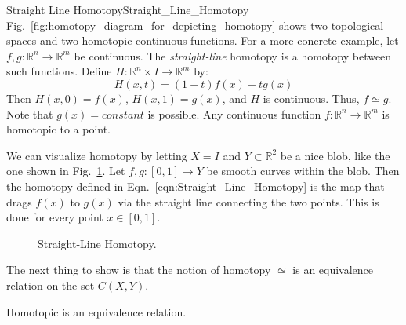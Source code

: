             \begin{lexample}{Straight Line Homotopy}{Straight_Line_Homotopy}
                Fig.~\ref{fig:homotopy_diagram_for_depicting_homotopy} shows
                two topological spaces and two homotopic continuous functions.
                For a more concrete example, let
                $f,g:\mathbb{R}^{n}\rightarrow\mathbb{R}^{m}$ be continuous.
                The \textit{straight-line} homotopy is a homotopy between such
                functions. Define
                $H:\mathbb{R}^{n}\times{I}\rightarrow\mathbb{R}^{m}$ by:
                \begin{equation}
                    \label{eqn:Straight_Line_Homotopy}
                    H(x,t)=(1-t)f(x)+tg(x)
                \end{equation}
                Then $H(x,0)=f(x)$, $H(x,1)=g(x)$, and $H$ is continuous. Thus,
                ${f}\simeq{g}$. Note that $g(x)=constant$ is possible. Any
                continuous function $f:\mathbb{R}^{n}\rightarrow\mathbb{R}^{m}$
                is homotopic to a point.
            \end{lexample}
            We can visualize homotopy by letting $X=I$ and
            $Y\subset\mathbb{R}^{2}$ be a nice blob, like the one shown in
            Fig.~\ref{fig:straight_line_homotopy}. Let
            $f,g:[0,1]\rightarrow Y$ be smooth curves within the blob. Then
            the homotopy defined in Eqn.~\ref{eqn:Straight_Line_Homotopy} is
            the map that drags $f(x)$ to $g(x)$ via the straight line
            connecting the two points. This is done for every point
            $x\in [0,1]$.
            \begin{figure}[H]
                \centering
                \captionsetup{type=figure}
                
                \caption{Straight-Line Homotopy.}
                \label{fig:straight_line_homotopy}
            \end{figure}
            The next thing to show is that the notion of homotopy $\simeq$
            is an equivalence relation on the set $C(X,Y)$.
            \begin{theorem}
                Homotopic is an equivalence relation.
            \end{theorem}
